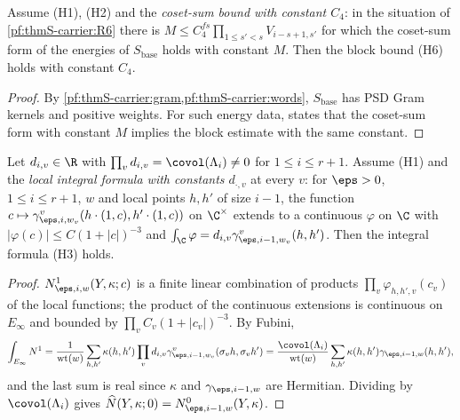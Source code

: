 \begin{lemma}\label{pf:thmS-carrier:corT}
Assume (H1), (H2) and the \emph{coset-sum bound with constant $C_4$}: in the situation of \ref{pf:thmS-carrier:R6} there is
$M\le C_4^{fs}\prod_{1\le s'<s}V_{i-s+1,s'}$ for which the coset-sum form of the energies of $S_{\mathrm{base}}$ holds with
constant $M$. Then the block bound (H6) holds with constant $C_4$.
\end{lemma}

\begin{proof}
By \cref{pf:thmS-carrier:gram,pf:thmS-carrier:words}, $S_{\mathrm{base}}$ has PSD Gram kernels and positive weights. For such
energy data,  states that the coset-sum form with constant $M$
implies the block estimate with the same constant.
\end{proof}

\begin{lemma}\label{pf:thmS-carrier:intplaces}
Let $d_{i,v}\in\R$ with $\prod_vd_{i,v}=\covol(\Lambda_i)\ne0$ for $1\le i\le r+1$. Assume (H1) and the \emph{local integral
formula with constants $d_{\cdot,v}$} at every $v$: for $\eps>0$, $1\le i\le r+1$, $w$ and local points $h,h'$ of size $i-1$,
the function $c\mapsto\gamma^v_{\eps,i,w_v}(h\cdot(1,c),h'\cdot(1,c))$ on $\C^\times$ extends to a continuous $\varphi$ on
$\C$ with $|\varphi(c)|\le C(1+|c|)^{-3}$ and $\int_\C\varphi=d_{i,v}\gamma^v_{\eps,i-1,w_v}(h,h')$. Then the integral formula
(H3) holds.
\end{lemma}

\begin{proof}
$N^1_{\eps,i,w}(Y,\kappa;c)$ is a finite linear combination of products $\prod_v\varphi_{h,h',v}(c_v)$ of the local functions;
the product of the continuous extensions is continuous on $E_\infty$ and bounded by $\prod_vC_v(1+|c_v|)^{-3}$. By Fubini,
\[
\int_{E_\infty}N^1=\frac1{\thmScarrierWt(w)}\sum_{h,h'}\kappa(h,h')\prod_vd_{i,v}\gamma^v_{\eps,i-1,w_v}(\sigma_vh,\sigma_vh')
=\frac{\covol(\Lambda_i)}{\thmScarrierWt(w)}\sum_{h,h'}\kappa(h,h')\gamma_{\eps,i-1,w}(h,h'),
\]
and the last sum is real since $\kappa$ and $\gamma_{\eps,i-1,w}$ are Hermitian. Dividing by $\covol(\Lambda_i)$ gives
$\thmScarrierNhat(Y,\kappa;0)=\thmScarrierNz_{\eps,i-1,w}(Y,\kappa)$.
\end{proof}

